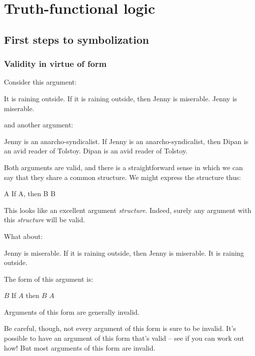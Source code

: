 \part{Truth-functional logic}
\label{ch.TFL}

\chapter{First steps to symbolization}

\section{Validity in virtue of form}\label{s:ValidityInVirtueOfForm}
Consider this argument:
	\begin{earg}
		\prem It is raining outside.
		\prem If it is raining outside, then Jenny is miserable.
		\conc Jenny is miserable.
	\end{earg}
and another argument:
	\begin{earg}
		\prem Jenny is an anarcho-syndicalist.
		\prem If Jenny is an anarcho-syndicalist, then Dipan is an avid reader of Tolstoy.
		\conc Dipan is an avid reader of Tolstoy.
	\end{earg}
Both arguments are valid, and there is a straightforward sense in which we can say that they share a common structure. We might express the structure thus:
	\begin{earg}
		\prem A
		\prem If A, then B
		\conc B
	\end{earg}
This looks like an excellent argument \emph{structure}. Indeed, surely any argument with this \emph{structure} will be valid.

What about:
	\begin{earg}
		\prem Jenny is miserable.
		\prem If it is raining outside, then Jenny is miserable.
		\conc It is raining outside.
	\end{earg}
The form of this argument is:
\begin{earg}
\prem	$B$
\prem	If $A$ then $B$
\conc $A$
\end{earg}
Arguments of this form are generally invalid.

Be careful, though, not every argument of this form is sure to be invalid.
It’s possible to have an argument of this form that’s valid – see if you can work out how!
But most arguments of this form are invalid.



